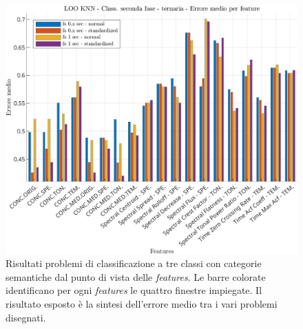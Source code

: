 \begin{center}	
	\begin{figure}[htp]
		\centering
		\includegraphics[width=1\textwidth]{img/cap4-classificazione_fase2_features_ternaria.jpg}
		\caption{Risultati problemi di classificazione a tre classi con categorie semantiche dal punto di
			vista delle \textit{features}. Le barre colorate identificano per ogni \textit{features} le quattro finestre impiegate. Il risultato esposto è la sintesi dell’errore medio tra i vari problemi disegnati.}
		\label{fig4.8}
	\end{figure}
\end{center}
